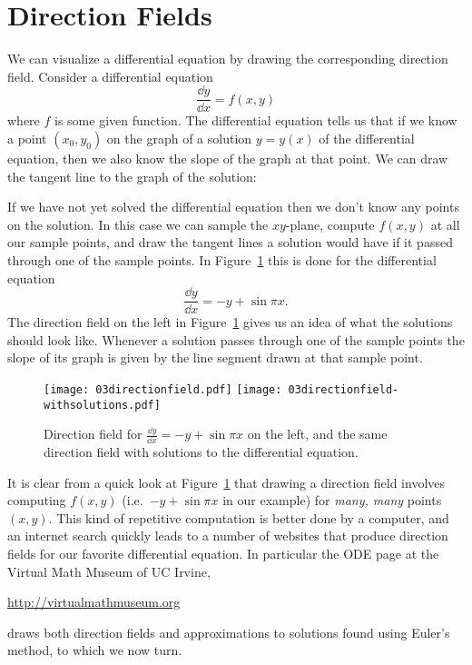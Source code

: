 \section{Direction Fields} %
\label{sec:direction-fields}
We can visualize a differential equation by drawing the corresponding direction
field.  Consider a differential equation
\[
\frac{\dd y} {\dd x} = f(x,y)
\]
where $f$ is some given function.  The differential equation tells us that if we know
a point $(x_0, y_0)$ on the graph of a solution $y=y(x)$ of the differential
equation, then we also know the slope of the graph at that point.  We can draw the
tangent line to the graph of the solution:
\begin{center}\sffamily\footnotesize
  
\end{center}
If we have not yet solved the differential equation then we don't know any points on
the solution.  In this case we can sample the $xy$-plane, compute $f(x,y)$ at all our
sample points, and draw the tangent lines a solution would have if it passed through
one of the sample points.  In Figure~\ref{fig:direction-fields} this is done for the
differential equation
\[
\frac{\dd y} {\dd x} = -y + \sin \pi x.
\]
The direction field on the left in Figure~\ref{fig:direction-fields} gives us an idea
of what the solutions should look like.  Whenever a solution passes through one of
the sample points the slope of its graph is given by the line segment drawn at that
sample point.
\begin{figure}[b]
  \centering
  \texttt{[image: 03directionfield.pdf]}\hfill
  \texttt{[image: 03directionfield-withsolutions.pdf]}
  \caption{Direction field for $\frac{\dd y}{\dd x} = -y+\sin\pi x$ on the left, and
    the same direction field with solutions to the differential equation.}
  \label{fig:direction-fields}
\end{figure}
It is clear from a quick look at Figure~\ref{fig:direction-fields} that drawing a
direction field involves computing $f(x,y)$ (i.e.~$-y+\sin\pi x$ in our example) for
\textit{many, many} points $(x, y)$.  This kind of repetitive computation is better
done by a computer, and an internet search quickly leads to a number of websites that
produce direction fields for our favorite differential equation.  In particular the
ODE page at the Virtual Math Museum of UC Irvine,
\begin{center}
  \url{http://virtualmathmuseum.org}
\end{center}
draws both direction fields and approximations to solutions found using Euler's
method, to which we now turn.


